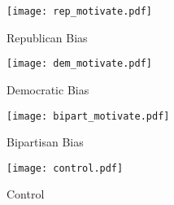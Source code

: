 \documentclass[12pt, letterpaper]{article}
\begin{document}
\begin{figure}[H]
\centering
{}
\caption{Republican Bias}
\texttt{[image: rep\_motivate.pdf]}
\smallskip
\end{figure}

\begin{figure}[H]
\centering
{}
\caption{Democratic Bias}
\texttt{[image: dem\_motivate.pdf]}
\smallskip
\end{figure}

\begin{figure}[H]
\centering
{}
\caption{Bipartisan Bias}
\texttt{[image: bipart\_motivate.pdf]}
\smallskip
\end{figure}

\begin{figure}[H]
\centering
{}
\caption{Control}
\texttt{[image: control.pdf]}
\smallskip
\end{figure}
\end{document}

